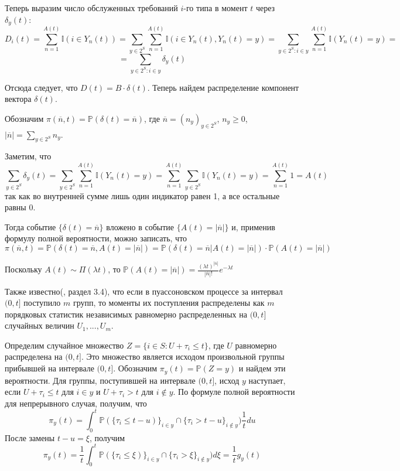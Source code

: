 \documentclass[12pt]{article}
\theoremstyle{plain}
\theoremstyle{definition}
\theoremstyle{remark}
\begin{document}
Теперь выразим число обслуженных требований $i$-го типа в момент $t$ через $\delta_y(t)$:
\[
    D_i(t) = \sum_{n=1}^{A(t)}\mathbb{I}(i \in Y_n(t)) = \sum_{y \in 2^S}\sum_{n=1}^{A(t)}\mathbb{I}(i \in Y_n(t), Y_n(t) = y) = \sum_{y\in 2^S: i \in y}\sum_{n=1}^{A(t)}\mathbb{I}(Y_n(t)=y) = 
\]
\[
    = \sum_{y\in 2^S: i \in y}\delta_y(t)
\]

Отсюда следует, что $D(t) = B \cdot \delta(t)$. Теперь найдем распределение компонент вектора $\delta(t)$.

Обозначим $\pi(\overline{n}, t) = \mathbb{P}(\delta(t) = \overline{n})$, где $\overline{n} = (n_y)_{y \in 2^S}$, $n_y \ge 0$, $|\overline{n}| = \sum_{y \in 2^S}n_y$. 

Заметим, что 
\[
    \sum_{y \in 2^S} \delta_y(t) = \sum_{y \in 2^S}\sum_{n=1}^{A(t)}\mathbb{I}(Y_n(t) = y) = \sum_{n=1}^{A(t)}\sum_{y \in 2^S}\mathbb{I}(Y_n(t) = y) = \sum_{n=1}^{A(t)} 1 = A(t) 
\]
так как во внутренней сумме лишь один индикатор равен 1, а все остальные равны 0.

Тогда событие $\{\delta(t) = \overline{n}\}$ вложено в событие $\{A(t) = |\overline{n}|\}$ и, применив формулу полной вероятности, можно записать, что
\[
    \pi(\overline{n}, t) = \mathbb{P}(\delta(t) = \overline{n}, A(t) = |\overline{n}|) = \mathbb{P}(\delta(t) = \overline{n}| A(t) = |\overline{n}|) \cdot \mathbb{P}(A(t) = |\overline{n}|)
\]

Поскольку $A(t) \sim \Pi(\lambda t)$, то $\mathbb{P}(A(t) = |\overline{n}|) = \frac{(\lambda t)^{|\overline{n}|}}{|\overline{n}|!}e^{-\lambda t}$

Также известно(\cite{falinrisk}, раздел 3.4), что если в пуассоновском процессе за интервал $(0,t]$ поступило $m$ групп, то моменты их поступления распределены как $m$ порядковых статистик независимых равномерно распределенных на $(0,t]$ случайных величин $U_1,...,U_m$.

Определим случайное множество $Z = \{i \in S: U + \tau_i \le t\}$, где $U$ равномерно распределена на $(0, t]$. Это множество является исходом произвольной группы прибывшей на интервале $(0,t]$. Обозначим $\pi_y(t) = \mathbb{P}(Z = y)$ и найдем эти вероятности. Для группы, поступившей на интервале $(0, t]$, исход $y$ наступает, если $U + \tau_i \le t$ для $i \in y$ и $U  + \tau_i > t$ для $i \not\in y$. По формуле полной вероятности для непрерывного случая, получим, что 
\[
    \pi_y(t) = \int_0^t\mathbb{P}(\{\tau_i \le t - u)\}_{i \in y} \cap \{\tau_i > t - u\}_{i \not\in y})\frac{1}{t}du
\]
После замены $t - u = \xi$, получим
\[
    \pi_y(t) = \frac{1}{t}\int_0^t\mathbb{P}(\{\tau_i \le \xi)\}_{i \in y} \cap \{\tau_i > \xi\}_{i \not\in y})d\xi = \frac{1}{t}g_y(t)
\]
\end{document}
